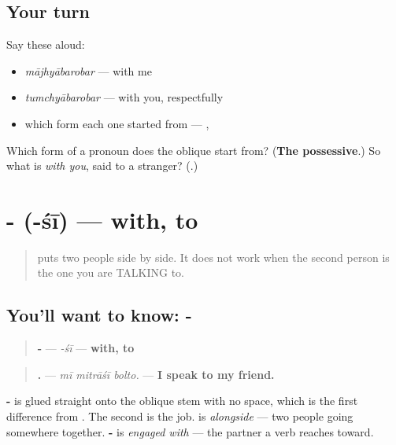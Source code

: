 \subsection*{Your turn}
Say these aloud:

\begin{itemize}
\raggedright
  \item \emph{mājhyābarobar} — with me
  \item \emph{tumchyābarobar} — with you, respectfully
  \item which form each one started from — \emph{\textbf{}}, \emph{\textbf{}}
\end{itemize}

\begin{tcolorbox}[breakable,colback=teal!4,colframe=teal!35!black,title={Before you move on}]
Which form of a pronoun does the oblique start from? (\textbf{The possessive}.) So what is \emph{with you}, said to a stranger? (\textbf{}.)
\end{tcolorbox}
\section[\texorpdfstring{-\mr{शी} (-śī)}{-शी (-śī)}]{- (-śī) — with, to}

\label{lesson:MR-C45-shii}



\begin{quote}
\textbf{} puts two people side by side. It does not work when the second person is the one you are TALKING to.
\end{quote}

\subsection*{You'll want to know: -}
\begin{quote}
\textbf{-} — \emph{-śī} — \textbf{with, to}
\end{quote}

\begin{quote}
\textbf{  .} — \emph{mī mitrāśī bolto.} — \textbf{I speak to my friend.}
\end{quote}

\textbf{-} is glued straight onto the oblique stem with no space, which is the first difference from \textbf{}. The second is the job. \textbf{} is \emph{alongside} — two people going somewhere together. \textbf{-} is \emph{engaged with} — the partner a verb reaches toward.

